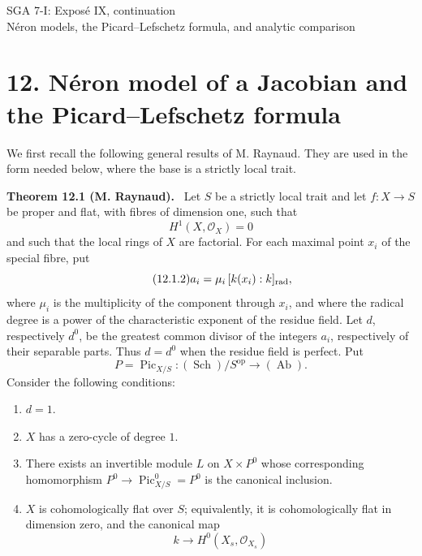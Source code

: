 \documentclass[11pt]{article}
\providecommand{\Pic}{\operatorname{Pic}}
\providecommand{\cO}{\mathcal O}
\providecommand{\op}{\mathrm{op}}
\providecommand{\Ab}{\operatorname{Ab}}
\providecommand{\Sch}{\operatorname{Sch}}
\newenvironment{statement}[1]{\par\medskip\noindent\textbf{#1.}\ }{\par\medskip}
\begin{document}
\begin{center}
{\Large SGA 7-I: Expos\'e IX, continuation}\\[0.4em]
{\large N\'eron models, the Picard--Lefschetz formula, and analytic comparison}
\end{center}

\section*{12. N\'eron model of a Jacobian and the Picard--Lefschetz formula}

We first recall the following general results of M. Raynaud.  They are used in the form needed below, where the base is a strictly local trait.

\begin{statement}{Theorem 12.1 (M. Raynaud)}
Let \(S\) be a strictly local trait and let \(f:X\to S\) be proper and flat, with fibres of dimension one, such that
\begin{equation}\tag{12.1.1}
        H^1(X,\cO_X)=0
\end{equation}
and such that the local rings of \(X\) are factorial.  For each maximal point \(x_i\) of the special fibre, put
\begin{equation}\tag{12.1.2}
        a_i=\mu_i\,[k(x_i):k]_{\rm rad},
\end{equation}
where \(\mu_i\) is the multiplicity of the component through \(x_i\), and where the radical degree is a power of the characteristic exponent of the residue field.  Let \(d\), respectively \(d^0\), be the greatest common divisor of the integers \(a_i\), respectively of their separable parts.  Thus \(d=d^0\) when the residue field is perfect.  Put
\begin{equation}\tag{12.1.3}
        P=\Pic_{X/S}\colon (\Sch)/S^{\op}\longrightarrow (\Ab).
\end{equation}
Consider the following conditions:
\begin{enumerate}[label=\arabic*)]
\item \(d=1\).
\item \(X\) has a zero-cycle of degree \(1\).
\item There exists an invertible module \(L\) on \(X\times P^0\) whose corresponding homomorphism \(P^0\to \Pic^0_{X/S}=P^0\) is the canonical inclusion.
\item \(X\) is cohomologically flat over \(S\); equivalently, it is cohomologically flat in dimension zero, and the canonical map
\[
        k\longrightarrow H^0(X_s,\cO_{X_s})
\]
\end{enumerate}
\end{statement}
\end{document}
